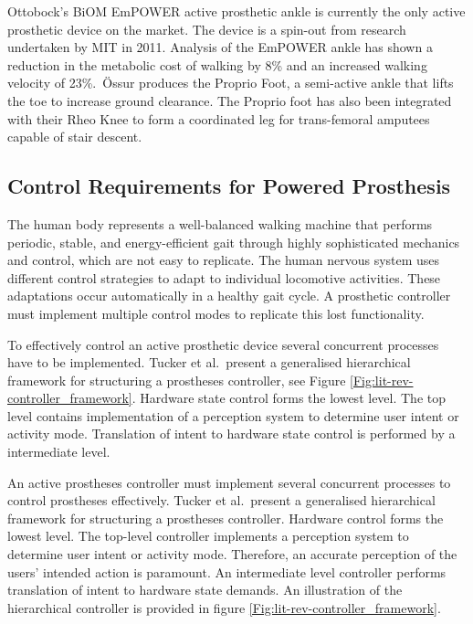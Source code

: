 Ottobock's BiOM EmPOWER active prosthetic ankle is currently the only active prosthetic device on the market.\cite{Nayak2020} The device is a spin-out from research undertaken by MIT in 2011.\cite{biom2018} Analysis of the EmPOWER ankle has shown a reduction in the metabolic cost of walking by 8\% and an increased walking velocity of 23\%\cite{Herr2012}.\ {\"O}ssur produces the Proprio Foot, a semi-active ankle that lifts the toe to increase ground clearance. The Proprio foot has also been integrated with their Rheo Knee to form a coordinated leg for trans-femoral amputees capable of stair descent.\cite{Ossur}

\subsection{Control Requirements for Powered Prosthesis} %
The human body represents a well-balanced walking machine that performs periodic, stable, and energy-efficient gait through highly sophisticated mechanics and control, which are not easy to replicate\cite{Mummolo2013}. The human nervous system uses different control strategies to adapt to individual locomotive activities\cite{Lay2007, Simon2013}. These adaptations occur automatically in a healthy gait cycle. A prosthetic controller must implement multiple control modes to replicate this lost functionality.

To effectively control an active prosthetic device several concurrent processes have to be implemented. Tucker et al.~present a generalised hierarchical framework for structuring a prostheses controller, see Figure \ref{Fig:lit-rev-controller_framework}. Hardware state control forms the lowest level. The top level contains implementation of a perception system to determine user intent or activity mode. Translation of intent to hardware state control is performed by a intermediate level.\cite{Tucker2015}

An active prostheses controller must implement several concurrent processes to control prostheses effectively. Tucker et al.~present a generalised hierarchical framework for structuring a prostheses controller. Hardware control forms the lowest level. The top-level controller implements a perception system to determine user intent or activity mode. Therefore, an accurate perception of the users' intended action is paramount\cite{Asif2021, Hernandez2021}. An intermediate level controller performs translation of intent to hardware state demands. An illustration of the hierarchical controller is provided in figure \ref{Fig:lit-rev-controller_framework}.\cite{Tucker2015}

